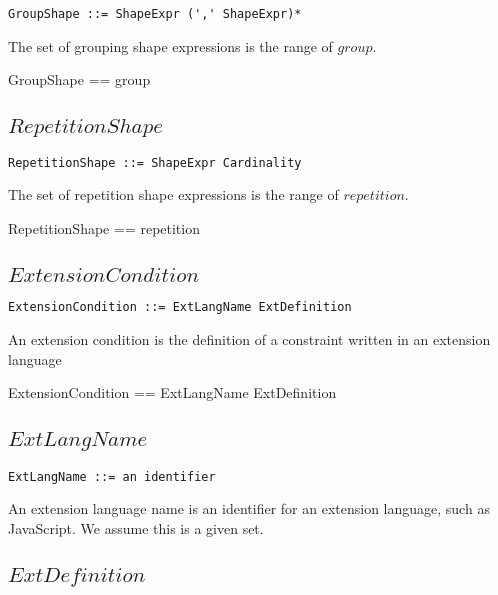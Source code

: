 \documentclass{article}
\begin{document}
\begin{verbatim}
GroupShape ::= ShapeExpr (',' ShapeExpr)*
\end{verbatim}

The set of grouping shape expressions is the range of $group$.
\begin{zed}
	GroupShape == \ran group
\end{zed}

\subsection{$RepetitionShape$}

\begin{verbatim}
RepetitionShape ::= ShapeExpr Cardinality
\end{verbatim}

The set of repetition shape expressions is the range of $repetition$.
\begin{zed}
	RepetitionShape == \ran repetition
\end{zed}

\subsection{$ExtensionCondition$}

\begin{verbatim}
ExtensionCondition ::= ExtLangName ExtDefinition
\end{verbatim}

An extension condition is the definition of a constraint written in an extension language
\begin{zed}
	ExtensionCondition == ExtLangName \cross ExtDefinition
\end{zed}

\subsection{$ExtLangName$}

\begin{verbatim}
ExtLangName ::= an identifier
\end{verbatim}

An extension language name is an identifier for an extension language, such as JavaScript.
We assume this is a given set.
\begin{zed}
	[ExtLangName]
\end{zed}

\subsection{$ExtDefinition$}
\end{document}
